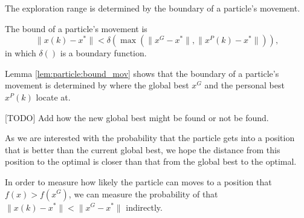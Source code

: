 The exploration range is determined by the boundary of a particle's movement.

\begin{mylem}
\label{lem:particle:bound_mov}
The bound of a particle's movement is 
\begin{equation}
\lVert x(k) - x^{*} \rVert < \delta ( \max ( \lVert x^{G} - x^{*} \rVert , \lVert x^{P}(k) - x^{*}  \rVert ) ),
\end{equation}
in which $ \delta () $ is a boundary function. 
\end{mylem}

Lemma \ref{lem:particle:bound_mov} shows that the boundary of a particle's movement is determined by where the global best $ x^{G} $ and the personal best $ x^{P}(k) $ locate at.

[TODO] Add how the new global best might be found or not be found.

As we are interested with the probability that the particle gets into a position that is better than the current global best, we hope the distance from this position to the optimal is closer than that from the global best to the optimal.

In order to measure how likely the particle can moves to a position that $ f(x) > f(x^{G}) $, we can measure the probability of that $ \lVert x(k) - x^{*} \rVert < \lVert x^{G} - x^{*} \rVert $ indirectly.

